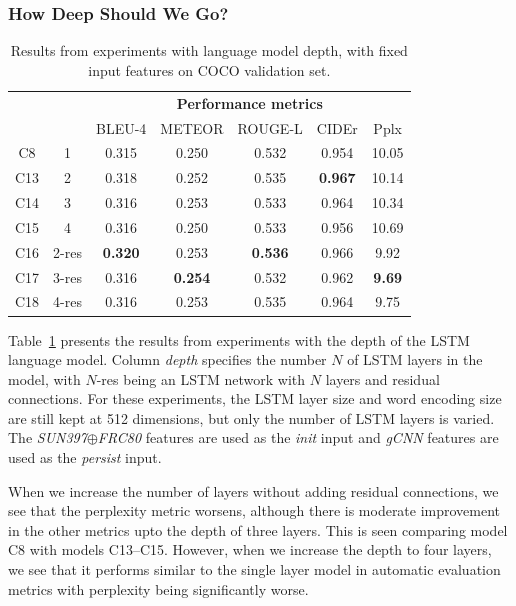 \subsubsection{How Deep Should We Go?}
\label{subsec:exptdepth}
\begin{table}[tbh]
  \centering
  \newcommand{\bs}{\small}
  \begin{adjustbox}{center}
  \begin{tabular}{|c|c|c|c|c|c|c|}
    \hline
    \bf \multirow{2}{*}{\#} & \bf \multirow{2}{*}{Depth} & \multicolumn{5}{c|}{\bf Performance metrics}\\
    \cline{3-7}
    \bf &\bf &\bs BLEU-4 &\bs METEOR &\bs ROUGE-L &\bs CIDEr&\bs Pplx \\\hline
    C8  & 1   & 0.315 & 0.250 & 0.532 & 0.954 &10.05  \\\hline
    C13 & 2   & 0.318 & 0.252 & 0.535 &\bf0.967 & 10.14  \\
    C14 & 3   & 0.316 & 0.253 & 0.533 & 0.964   & 10.34  \\
    C15 & 4   & 0.316 & 0.250 & 0.533 & 0.956 & 10.69  \\\hline
    C16 &2-res&\bf0.320& 0.253 &\bf0.536&0.966  & 9.92   \\
    C17 &3-res& 0.316 &\bf0.254&0.532 & 0.962   &\bf9.69 \\
    C18 &4-res& 0.316 & 0.253 & 0.535 & 0.964   & 9.75 \\\hline
  \end{tabular}
  \end{adjustbox}
  \caption{Results from experiments with language model depth, with fixed input features on COCO validation set.}
  \label{tab:resCocDepthExpt}
\end{table}

Table~\ref{tab:resCocDepthExpt} presents the results from experiments with the
depth of the LSTM language model.
Column \emph{depth} specifies the number $N$ of LSTM layers in the model,
with $N$-res being an LSTM network with $N$ layers and residual connections.
For these experiments, the LSTM layer size and word encoding size are still kept
at 512 dimensions, but only the number of LSTM layers is varied.
The \emph{SUN397$\oplus$FRC80} features are used as the \emph{init} input and
\emph{gCNN} features are used as the \emph{persist} input.

When we increase the number of layers without adding residual connections, we
see that the perplexity metric worsens, although there is moderate improvement
in the other metrics upto the depth of three layers.
This is seen comparing model C8 with models C13--C15.
However, when we increase the depth to four layers, we see that it performs similar to
the single layer model in automatic evaluation metrics with perplexity being
significantly worse.

